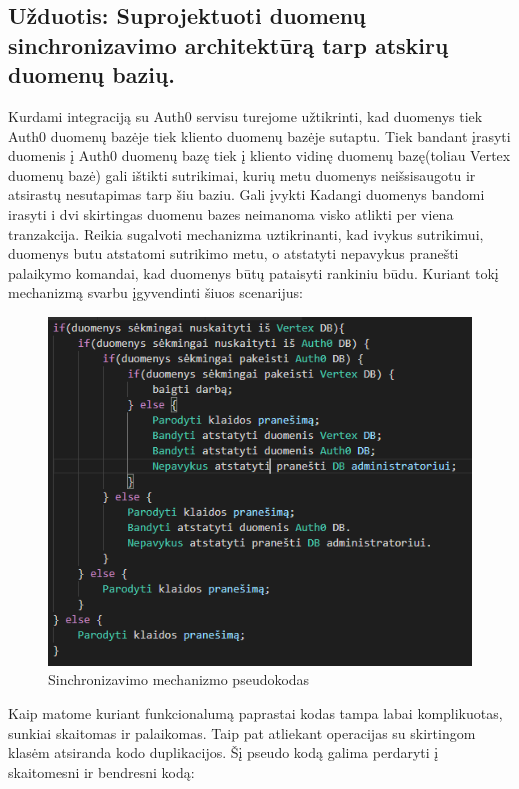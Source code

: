 \documentclass{VUMIFPSkursinis}
\begin{document}
	\subsection{Užduotis: Suprojektuoti duomenų sinchronizavimo architektūrą tarp atskirų duomenų bazių.}
		Kurdami integraciją su Auth0 servisu turejome užtikrinti, kad duomenys tiek Auth0 duomenų bazėje tiek kliento duomenų bazėje sutaptu.
		Tiek bandant įrasyti duomenis į Auth0 duomenų bazę tiek į kliento vidinę duomenų bazę(toliau Vertex duomenų bazė) gali ištikti sutrikimai, kurių metu duomenys neišsisaugotu ir atsirastų nesutapimas tarp šiu baziu.
		Gali įvykti 
		Kadangi duomenys bandomi irasyti i dvi skirtingas duomenu bazes neimanoma visko atlikti per viena tranzakcija.
		Reikia sugalvoti mechanizma uztikrinanti, kad ivykus sutrikimui, duomenys butu atstatomi sutrikimo metu, o atstatyti nepavykus pranešti palaikymo komandai, kad duomenys būtų pataisyti rankiniu būdu. 
		Kuriant tokį mechanizmą svarbu įgyvendinti šiuos scenarijus:
			\begin{figure}[H]
			\includegraphics[scale=0.7]{img/five}
			\caption{Sinchronizavimo mechanizmo pseudokodas} %
			\label{img:kurimoProcesas}
			\end{figure}
		Kaip matome kuriant funkcionalumą paprastai kodas tampa labai komplikuotas, sunkiai skaitomas ir palaikomas.
		Taip pat atliekant operacijas su skirtingom klasėm atsiranda kodo duplikacijos.
		Šį pseudo kodą galima perdaryti į skaitomesni ir bendresni kodą:
\end{document}
